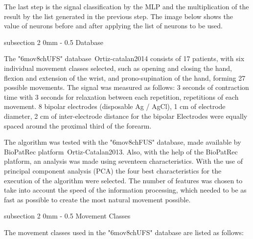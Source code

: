 \documentclass[a4paper, 12pt]{ppgeb}
\makeatletter
\renewcommand{\subsection}{\@startsection
{subsection}
{2}
{0mm}
{-\baselineskip}
{0.5\baselineskip}
{\bf\sffamily}}
\makeatother
\begin{document}
The last step is the signal classification by the MLP and the multiplication of the result by the list generated in the previous step. The image below shows the value of neurons before and after applying the list of neurons to be used.

\subsection{Database}

The "6mov8chUFS" database~\cite{mainreferences}{Ortiz-catalan2014} consists of 17 patients, with six individual movement classes selected, such as opening and closing the hand, flexion and extension of the wrist, and prono-supination of the hand, forming 27 possible movements. The signal was measured as follows: 3 seconds of contraction time with 3 seconds for relaxation between each repetition, repetitions of each movement. 8 bipolar electrodes (disposable Ag / AgCl), 1 cm of electrode diameter, 2 cm of inter-electrode distance for the bipolar Electrodes were equally spaced around the proximal third of the forearm.

The algorithm was tested with the "6mov8chFUS" database, made available by BioPatRec platform~\cite{mainreferences}{Ortiz-Catalan2013}. Also, with the help of the BioPatRec platform, an analysis was made using seventeen characteristics. With the use of principal component analysis (\ac{PCA}) the four best characteristics for the execution of the algorithm were selected. The number of features was chosen to take into account the speed of the information processing, which needed to be as fast as possible to create the most natural movement possible.

\subsection{Movement Classes}

The movement classes used in the "6mov8chUFS" database are listed as follows:
\end{document}
